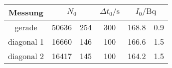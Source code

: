 \label{tab:tabReferenzmessung}
	\begin{tabular}{cS[table-format=5.0]@{${}\pm{}$}S[table-format=3.0]S[table-format=3.0]S[table-format=3.1]@{${}\pm{}$}S[table-format=1.1]}
		\toprule
		{Messung} &  & {$\Delta t_0/\si{\second}$} &  \\
		\midrule
		{gerade} & 50636 & 254 & 300 & 168.8 & 0.9 \\
		{diagonal 1} & 16660 & 146 & 100 & 166.6 & 1.5 \\
		{diagonal 2} & 16417 & 145 & 100 & 164.2 & 1.5 \\
		\bottomrule
	\end{tabular}
